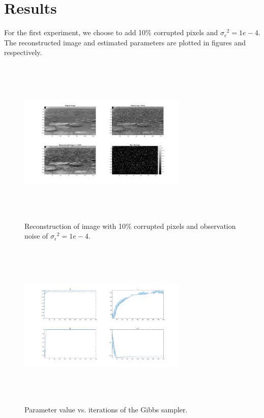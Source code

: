 \documentclass[a4paper,10pt]{article}
\def\sigmaeps{{\sigma_{\epsilon}}}
\begin{document}
\section{Results}
For the first experiment, we choose to add 10\% corrupted pixels and $\sigmaeps^2 = 1e-4$. The reconstructed image and estimated parameters are plotted in figures and respectively.
\begin{figure}[H]
 \centering
 \includegraphics[width=8cm, height=8cm]{image.png}
 \caption{Reconstruction of image with 10\% corrupted pixels and observation noise of $\sigmaeps^2 = 1e-4$.}
 \label{fig:img10}
\end{figure}
\begin{figure}[H]
 \centering
 \includegraphics[width=8cm, height=8cm]{params.png}
 \caption{Parameter value vs. iterations of the Gibbs sampler.}
 \label{fig:param10}
\end{figure}
\end{document}
